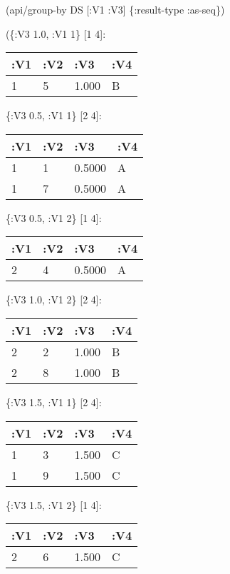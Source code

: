 \documentclass[]{article}
\newenvironment{Shaded}{\begin{snugshade}}{\end{snugshade}}
\newcommand{\AttributeTok}[1]{\textcolor[rgb]{0.77,0.63,0.00}{#1}}
\newcommand{\NormalTok}[1]{#1}
\begin{document}
\begin{Shaded}
\begin{Highlighting}[]
\NormalTok{(api/group-by DS [}\AttributeTok{:V1} \AttributeTok{:V3}\NormalTok{] \{}\AttributeTok{:result-type} \AttributeTok{:as-seq}\NormalTok{\})}
\end{Highlighting}
\end{Shaded}

(\{:V3 1.0, :V1 1\} {[}1 4{]}:

\begin{longtable}[]{@{}llll@{}}
\toprule
:V1 & :V2 & :V3 & :V4\tabularnewline
\midrule
\endhead
1 & 5 & 1.000 & B\tabularnewline
\bottomrule
\end{longtable}

\{:V3 0.5, :V1 1\} {[}2 4{]}:

\begin{longtable}[]{@{}llll@{}}
\toprule
:V1 & :V2 & :V3 & :V4\tabularnewline
\midrule
\endhead
1 & 1 & 0.5000 & A\tabularnewline
1 & 7 & 0.5000 & A\tabularnewline
\bottomrule
\end{longtable}

\{:V3 0.5, :V1 2\} {[}1 4{]}:

\begin{longtable}[]{@{}llll@{}}
\toprule
:V1 & :V2 & :V3 & :V4\tabularnewline
\midrule
\endhead
2 & 4 & 0.5000 & A\tabularnewline
\bottomrule
\end{longtable}

\{:V3 1.0, :V1 2\} {[}2 4{]}:

\begin{longtable}[]{@{}llll@{}}
\toprule
:V1 & :V2 & :V3 & :V4\tabularnewline
\midrule
\endhead
2 & 2 & 1.000 & B\tabularnewline
2 & 8 & 1.000 & B\tabularnewline
\bottomrule
\end{longtable}

\{:V3 1.5, :V1 1\} {[}2 4{]}:

\begin{longtable}[]{@{}llll@{}}
\toprule
:V1 & :V2 & :V3 & :V4\tabularnewline
\midrule
\endhead
1 & 3 & 1.500 & C\tabularnewline
1 & 9 & 1.500 & C\tabularnewline
\bottomrule
\end{longtable}

\{:V3 1.5, :V1 2\} {[}1 4{]}:

\begin{longtable}[]{@{}llll@{}}
\toprule
:V1 & :V2 & :V3 & :V4\tabularnewline
\midrule
\endhead
2 & 6 & 1.500 & C\tabularnewline
\bottomrule
\end{longtable}
\end{document}
